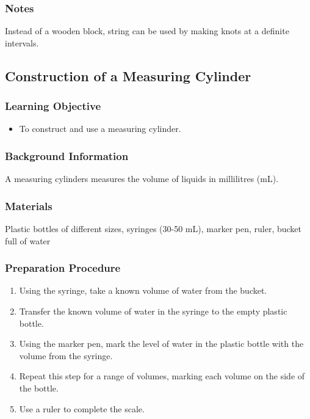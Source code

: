 \subsubsection*{Notes}
Instead of a wooden block, string can be used by making knots at a definite intervals.


\subsection{Construction of a Measuring Cylinder}

\subsubsection*{Learning Objective}
\begin{itemize}
\item{To construct and use a measuring cylinder.} 
\end{itemize}

\subsubsection*{Background Information}
A measuring cylinders measures the volume of liquids in millilitres (mL).

\subsubsection*{Materials}
Plastic bottles of different sizes, syringes (30-50 mL), marker pen, ruler, bucket full of water

\subsubsection*{Preparation Procedure}
\begin{enumerate}
\item{Using the syringe, take a known volume of water from the bucket.} 
\item{Transfer the known volume of water in the syringe to the empty plastic bottle.} 
\item{Using the marker pen, mark the level of water in the plastic bottle with the volume from the syringe.}
\item{Repeat this step for a range of volumes, marking each volume on the side of the bottle.}
\item{Use a ruler to complete the scale.} 
\end{enumerate}


